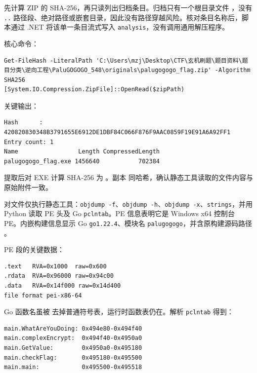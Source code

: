 先计算 ZIP 的 SHA-256，再只读列出归档条目。归档只有一个根目录文件 \texttt{}，没有 \texttt{..} 路径段、绝对路径或嵌套目录，因此没有路径穿越风险。核对条目名称后，脚本通过 .NET \texttt{} 将该单一条目流式写入 \texttt{analysis}，没有调用通用解压程序。

核心命令：

\begin{verbatim}
Get-FileHash -LiteralPath 'C:\Users\mzj\Desktop\CTF\玄机刷题\题目资料\题目分类\逆向工程\PaluGOGOGO_548\originals\palugogogo_flag.zip' -Algorithm SHA256
[System.IO.Compression.ZipFile]::OpenRead($zipPath)
\end{verbatim}

关键输出：

\begin{verbatim}
Hash      : 420820830348B3791655E6912DE1DBF84C066F876F9AAC0859F19E91A6A92FF1
Entry count: 1
Name                 Length CompressedLength
palugogogo_flag.exe 1456640           702384
\end{verbatim}

提取后对 EXE 计算 SHA-256 为 \texttt{}。副本 \texttt{} 同哈希，确认静态工具读取的文件内容与原始附件一致。

对文件仅执行静态工具：\texttt{objdump\ -f}、\texttt{objdump\ -h}、\texttt{objdump\ -x}、\texttt{strings}，并用 Python 读取 PE 头及 Go \texttt{pclntab}。PE 信息表明它是 Windows x64 控制台 PE。内嵌构建信息显示 Go \texttt{go1.22.4}、模块名 \texttt{palugogogo}，并含原构建源码路径 \texttt{}。

PE 段的关键数据：

\begin{verbatim}
.text   RVA=0x1000  raw=0x600
.rdata  RVA=0x96000 raw=0x94c00
.data   RVA=0x14f000 raw=0x14d400
file format pei-x86-64
\end{verbatim}

Go 函数名虽被 \texttt{} 去掉普通符号表，运行时函数表仍在。解析 \texttt{pclntab} 得到：

\begin{verbatim}
main.WhatAreYouDoing: 0x494e80-0x494f40
main.complexEncrypt:  0x494f40-0x4950a0
main.GetValue:        0x4950a0-0x495180
main.checkFlag:       0x495180-0x495500
main.main:            0x495500-0x495518
\end{verbatim}

